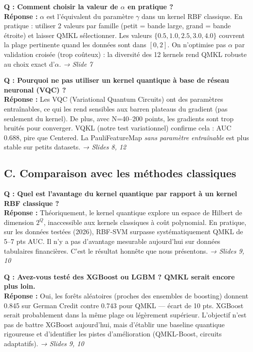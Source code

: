 \documentclass[12pt, a4paper]{article}
\begin{document}
\begin{question}
\textbf{Q : Comment choisir la valeur de $\alpha$ en pratique ?}\\[4pt]
\textbf{Réponse :} $\alpha$ est l'équivalent du paramètre $\gamma$ dans un kernel RBF classique.
En pratique : utiliser 2 valeurs par famille (petit = bande large, grand = bande étroite)
et laisser QMKL sélectionner. Les valeurs $\{0.5, 1.0, 2.5, 3.0, 4.0\}$ couvrent
la plage pertinente quand les données sont dans $[0, 2]$.
On n'optimise pas $\alpha$ par validation croisée (trop coûteux) :
la diversité des 12 kernels rend QMKL robuste au choix exact d'$\alpha$.
\hfill\textit{→ Slide 7}
\end{question}

\begin{question}
\textbf{Q : Pourquoi ne pas utiliser un kernel quantique à base de réseau neuronal (VQC) ?}\\[4pt]
\textbf{Réponse :} Les VQC (Variational Quantum Circuits) ont des paramètres entraînables,
ce qui les rend sensibles aux barren plateaus du gradient (pas seulement du kernel).
De plus, avec N=40--200 points, les gradients sont trop bruités pour converger.
VQKL (notre test variationnel) confirme cela : AUC 0.688, pire que Centered.
La PauliFeatureMap \emph{sans paramètre entraînable} est plus stable sur petits datasets.
\hfill\textit{→ Slides 8, 12}
\end{question}

\subsection*{C. Comparaison avec les méthodes classiques}

\begin{question}
\textbf{Q : Quel est l'avantage du kernel quantique par rapport à un kernel RBF classique ?}\\[4pt]
\textbf{Réponse :} Théoriquement, le kernel quantique explore un espace de Hilbert de dimension $2^Q$,
inaccessible aux kernels classiques à coût polynomial.
En pratique, sur les données testées (2026), RBF-SVM surpasse systématiquement QMKL de 5--7 pts AUC.
Il n'y a pas d'avantage mesurable aujourd'hui sur données tabulaires financières.
C'est le résultat honnête que nous présentons.
\hfill\textit{→ Slides 9, 10}
\end{question}

\begin{question}
\textbf{Q : Avez-vous testé des XGBoost ou LGBM ? QMKL serait encore plus loin.}\\[4pt]
\textbf{Réponse :} Oui, les forêts aléatoires (proches des ensembles de boosting) donnent 0.845
sur German Credit contre 0.743 pour QMKL — écart de 10 pts.
XGBoost serait probablement dans la même plage ou légèrement supérieur.
L'objectif n'est pas de battre XGBoost aujourd'hui, mais d'établir une baseline quantique rigoureuse
et d'identifier les pistes d'amélioration (QMKL-Boost, circuits adaptatifs).
\hfill\textit{→ Slides 9, 10}
\end{question}
\end{document}
